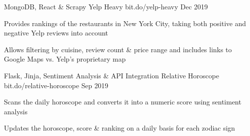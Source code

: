 

\begin{cventries}

 \cventry
    {MongoDB, React \& Scrapy} %
    {Yelp Heavy} %
    {bit.do/yelp-heavy} %
    {Dec 2019} %
    {
      \begin{cvitems} %
        \item {Provides rankings of the restaurants in New York City, taking both positive and negative Yelp reviews into account}
        \item {Allows filtering by cuisine, review count \& price range and includes links to Google Maps vs. Yelp's proprietary map}
      \end{cvitems}
    }

 \cventry
    {Flask, Jinja, Sentiment Analysis \& API Integration} %
    {Relative Horoscope} %
    {bit.do/relative-horoscope} %
    {Sep 2019} %
    {
      \begin{cvitems} %
        \item {Scans the daily horoscope and converts it into a numeric score using sentiment analysis}
        \item {Updates the horoscope, score \& ranking on a daily basis for each zodiac sign}
      \end{cvitems}
    }

\end{cventries}
